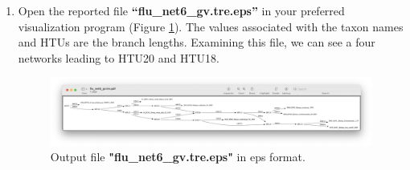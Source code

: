 \documentclass[11pt]{article}
\begin{document}
\begin {enumerate}
\item  Open the reported file \textbf{``flu\_net6\_gv.tre.eps''} in your preferred
visualization program (Figure \ref{eps6}). The values associated with the taxon 
names and HTUs are the branch lengths. Examining this file, we can see a four
networks leading to HTU20 and HTU18.

\begin{figure}[H]
\centering
\includegraphics[width=\textwidth]{eps6.png}
\caption{Output file \textbf{"flu\_net6\_gv.tre.eps"} in eps format.}
\label{eps6}
\end{figure}

\end{enumerate}


\end{document}
